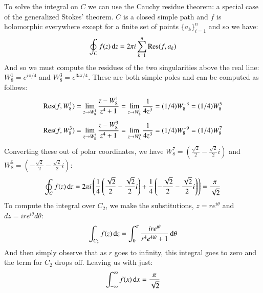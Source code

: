 To solve the integral on $C$ we can use the Cauchy residue theorem: a special case of the generalized Stokes' theorem.
$C$ is a closed simple path and $f$ is holomorphic everywhere except for a finite set of points $\{a_k\}_{i=1}^n$
and so we have:
\begin{equation}
	\oint_C f(z) \mathop{}\!\mathrm{d} z = 2 \pi i \sum_{k=1}^n \text{Res}(f, a_k)
\end{equation}
And so we must compute the residues of the two singularities above the real line: 
$W_8^1 = e^{i\pi/4}$ and $W_8^3 = e^{3i\pi/4}$.
These are both simple poles and can be computed as follows:
\begin{equation*}
	\text{Res}(f, W_8^1) =\lim_{z \to W_8^1} \frac{z - W_8^1}{z^4 +1} 
		= \lim_{z \to W_8^1} \frac{1}{4z^3}
		= (1/4) W_8^{-3} = (1/4) W_8^5
\end{equation*}
\begin{equation*}
	\text{Res}(f, W_8^3) =\lim_{z \to W_8^3} \frac{z - W_8^3}{z^4 +1} 
		= \lim_{z \to W_8^3} \frac{1}{4z^3}
		= (1/4) W_8^{-9} = (1/4) W_8^7
\end{equation*}
Converting these out of polar coordinates, we have 
	$W_8^7 = \left( \frac{\sqrt{2}}{2}-\frac{\sqrt{2}}{2}i \right)$ 
	and $W_8^5 =\left( -\frac{\sqrt{2}}{2}-\frac{\sqrt{2}}{2}i \right)$:
\begin{equation*}
	\oint_C f(z) \mathop{}\!\mathrm{d} z 
	= 2 \pi i \left( 	\frac{1}{4} \left( \frac{\sqrt{2}}{2}-\frac{\sqrt{2}}{2}i \right) 
				+	\frac{1}{4} \left( -\frac{\sqrt{2}}{2}-\frac{\sqrt{2}}{2}i \right)\right)
	= \frac{\pi}{\sqrt{2}}
\end{equation*}
To compute the integral over $C_2$, we make the substitutions, $z = re^{i \theta}$ and $dz=ire^{i\theta} d\theta$:
\begin{equation*}
	\int_{C_2} f(z) \mathop{}\!\mathrm{d} z = \int_0^\pi \frac{ire^{i\theta}}{r^4 e^{4i\theta} +1} \mathop{}\!\mathrm{d}\theta
\end{equation*}
And then simply observe that as $r$ goes to infinity, this integral goes to zero and the term for $C_2$ drops off.
Leaving us with just:
\begin{equation*}
	\int_{-\infty}^\infty f(x) \mathop{}\!\mathrm{d} x = \frac{\pi }{\sqrt{2}}
\end{equation*}

